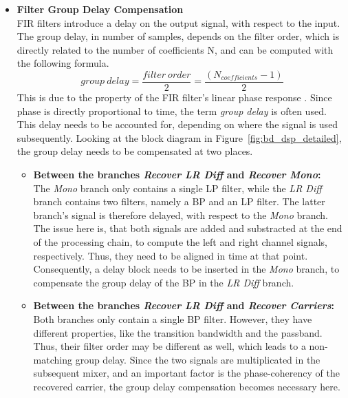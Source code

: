 \begin{itemize}
  \item \textbf{Filter Group Delay Compensation}\\
      FIR filters introduce a delay on the output signal, with respect to the input.
      The group delay, in number of samples, depends on the filter order, which is directly related to the number of coefficients N, and can be computed with the following formula.
      \begin{equation}
        group\ delay = \frac{filter\ order}{2} = \frac{(N_{coefficients} - 1)}{2}
      \end{equation}
      This is due to the property of the FIR filter's linear phase response \cite{GaziOrhan2018UDSP}.
      Since phase is directly proportional to time, the term \textit{group delay} is often used.
      This delay needs to be accounted for, depending on where the signal is used subsequently.
      Looking at the block diagram in Figure~\ref{fig:bd_dsp_detailed}, the group delay needs to be compensated at two places.

      \begin{itemize}
        \item \textbf{Between the branches \textit{Recover LR Diff} and \textit{Recover Mono}:}\\
          The \textit{Mono} branch only contains a single LP filter, while the \textit{LR Diff} branch contains two filters, namely a BP and an LP filter.
          The latter branch's signal is therefore delayed, with respect to the \textit{Mono} branch.\\
          The issue here is, that both signals are added and substracted at the end of the processing chain, to compute the left and right channel signals, respectively.
          Thus, they need to be aligned in time at that point.
          Consequently, a delay block needs to be inserted in the \textit{Mono} branch, to compensate the group delay of the BP in the \textit{LR Diff} branch.\\

        \item \textbf{Between the branches \textit{Recover LR Diff} and \textit{Recover Carriers}:}\\
          Both branches only contain a single BP filter.
          However, they have different properties, like the transition bandwidth and the passband.
          Thus, their filter order may be different as well, which leads to a non-matching group delay.
          Since the two signals are multiplicated in the subsequent mixer, and an important factor is the phase-coherency of the recovered carrier, the group delay compensation becomes necessary here.\\
      \end{itemize}


\end{itemize}
